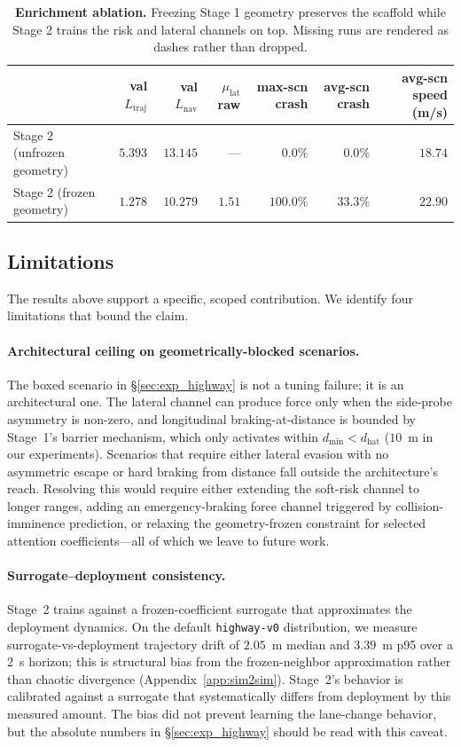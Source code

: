 \begin{table}[t]
\centering
\caption{\textbf{Enrichment ablation.} Freezing Stage 1 geometry preserves the scaffold while Stage 2 trains the risk and lateral channels on top. Missing runs are rendered as dashes rather than dropped.}
\label{tab:enrichment_ablation}
\small
\begin{tabular}{lrrrrrr}
\toprule
 & val $L_{\text{traj}}$ & val $L_{\text{nav}}$ & $\mu_{\text{lat}}$ raw & max-scn crash & avg-scn crash & avg-scn speed (m/s) \\
\midrule
Stage 2 (unfrozen geometry) & $5.393$ & $13.145$ & --- & $0.0\%$ & $0.0\%$ & $18.74$ \\
Stage 2 (frozen geometry) & $1.278$ & $10.279$ & $1.51$ & $100.0\%$ & $33.3\%$ & $22.90$ \\
\bottomrule
\end{tabular}
\end{table}

\subsection{Limitations}
\label{sec:exp_limitations}

The results above support a specific, scoped contribution.
We identify four limitations that bound the claim.

\paragraph{Architectural ceiling on geometrically-blocked scenarios.}
The boxed scenario in \S\ref{sec:exp_highway} is not a tuning failure; it is an architectural one.
The lateral channel can produce force only when the side-probe asymmetry is non-zero, and longitudinal braking-at-distance is bounded by Stage~1's barrier mechanism, which only activates within $d_{\min} < d_{\text{hat}}$ ($10$~m in our experiments).
Scenarios that require either lateral evasion with no asymmetric escape or hard braking from distance fall outside the architecture's reach.
Resolving this would require either extending the soft-risk channel to longer ranges, adding an emergency-braking force channel triggered by collision-imminence prediction, or relaxing the geometry-frozen constraint for selected attention coefficients---all of which we leave to future work.

\paragraph{Surrogate--deployment consistency.}
Stage~2 trains against a frozen-coefficient surrogate that approximates the deployment dynamics.
On the default \texttt{highway-v0} distribution, we measure surrogate-vs-deployment trajectory drift of $2.05$~m median and $3.39$~m p95 over a $2$~s horizon; this is structural bias from the frozen-neighbor approximation rather than chaotic divergence (Appendix~\ref{app:sim2sim}).
Stage~2's behavior is calibrated against a surrogate that systematically differs from deployment by this measured amount.
The bias did not prevent learning the lane-change behavior, but the absolute numbers in \S\ref{sec:exp_highway} should be read with this caveat.

